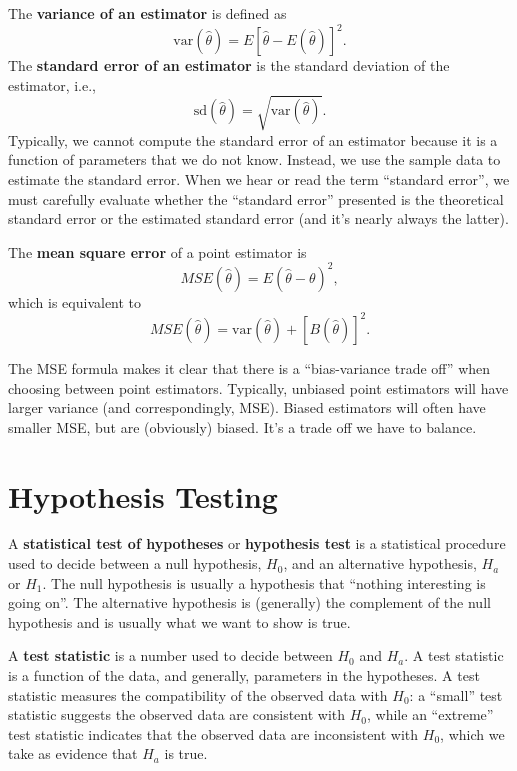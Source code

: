 \documentclass[
]{book}
\theoremstyle{definition}
\theoremstyle{definition}
\theoremstyle{definition}
\theoremstyle{definition}
\theoremstyle{remark}
\begin{document}
The \textbf{variance of an estimator} is defined as
\[
\mathrm{var}(\hat{\theta})=E[\hat{\theta}-E(\hat{\theta})]^2.
\]
The \textbf{standard error of an estimator} is the standard deviation of the estimator, i.e.,
\[
\mathrm{sd}(\hat{\theta})=\sqrt{\mathrm{var}(\hat{\theta})}.
\]
Typically, we cannot compute the standard error of an estimator because it is a function of parameters that we do not know. Instead, we use the sample data to estimate the standard error. When we hear or read the term ``standard error'', we must carefully evaluate whether the ``standard error'' presented is the theoretical standard error or the estimated standard error (and it's nearly always the latter).

The \textbf{mean square error} of a point estimator is
\[
MSE(\hat{\theta})=E(\hat{\theta}-\theta)^{2},
\]
which is equivalent to
\[
MSE(\hat{\theta})=\mathrm{var}(\hat{\theta})+[B(\hat{\theta})]^{2}.
\]

The MSE formula makes it clear that there is a ``bias-variance trade off'' when choosing between point estimators. Typically, unbiased point estimators will have larger variance (and correspondingly, MSE). Biased estimators will often have smaller MSE, but are (obviously) biased. It's a trade off we have to balance.

\hypertarget{hypothesis-testing}{%
\section{Hypothesis Testing}\label{hypothesis-testing}}

A \textbf{statistical test of hypotheses} or \textbf{hypothesis test} is a
statistical procedure used to decide between a null hypothesis, \(H_0\), and an alternative hypothesis, \(H_a\) or \(H_1\). The null hypothesis is usually a hypothesis that ``nothing interesting is going on''. The alternative hypothesis is (generally) the complement of the null hypothesis and is usually what we want to show is true.

A \textbf{test statistic} is a number used to decide between \(H_0\) and \(H_a\). A test statistic is a function of the data, and generally, parameters in the hypotheses. A test statistic measures the compatibility of the observed data with \(H_0\): a ``small'' test statistic suggests the observed data are consistent with \(H_0\), while an ``extreme'' test statistic indicates that the observed data are inconsistent with \(H_0\), which we take as evidence that \(H_a\) is true.
\end{document}
